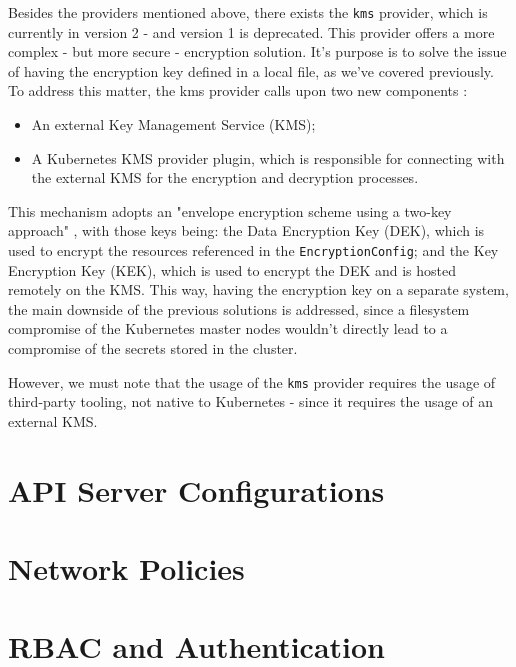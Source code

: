 \documentclass[a4paper,11pt,openright,BCOR=15mm]{scrbook}
\begin{document}
Besides the providers mentioned above, there exists the \texttt{kms} provider, which is currently in version 2 - and version 1 is deprecated. This provider offers a more complex - but more secure - encryption solution. It's purpose is to solve the issue of having the encryption key defined in a local file, as we've covered previously. To address this matter, the kms provider calls upon two new components \cite{gkatziouras_kubernetes_2024}: 

\begin{itemize}
	\item An external Key Management Service (KMS);
	\item A Kubernetes KMS provider plugin, which is responsible for connecting with the external KMS for the encryption and decryption processes.
\end{itemize}

This mechanism adopts an "envelope encryption scheme using a two-key approach" \cite{gkatziouras_kubernetes_2024}, with those keys being: the Data Encryption Key (DEK), which is used to encrypt the resources referenced in the \texttt{EncryptionConfig}; and the Key Encryption Key (KEK), which is used to encrypt the DEK and is hosted remotely on the KMS. This way, having the encryption key on a separate system, the main downside of the previous solutions is addressed, since a filesystem compromise of the Kubernetes master nodes wouldn't directly lead to a compromise of the secrets stored in the cluster.

However, we must note that the usage of the \texttt{kms} provider requires the usage of third-party tooling, not native to Kubernetes - since it requires the usage of an external KMS. 


	\section{API Server Configurations}
	
	\section{Network Policies}
	
	\section{RBAC and Authentication}
		
\end{document}
